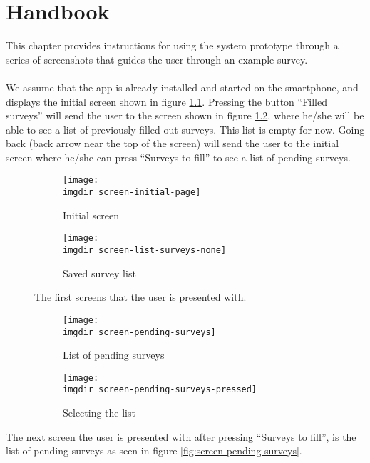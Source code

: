 \chapter{Handbook}
\label{chap:handbook}
This chapter provides instructions for using the system prototype through a series of screenshots that guides the user through an example survey.\\\\
We assume that the app is already installed and started on the smartphone, and displays the initial screen shown in figure \ref{fig:screen-initial-page}. Pressing the button ``Filled surveys'' will send the user to the screen shown in figure \ref{fig:screen-list-surveys-none}, where he/she will be able to see a list of previously filled out surveys. This list is empty for now. Going back (back arrow near the top of the screen) will send the user to the initial screen where he/she can press ``Surveys to fill'' to see a list of pending surveys.
\begin{figure}[!htbp]
 \centering

 \begin{subfigure}{.3\textwidth}
    \centering
    \texttt{[image: \\imgdir screen-initial-page]}
    \caption{Initial screen}
    \label{fig:screen-initial-page}
  \end{subfigure}
  \begin{subfigure}{.3\textwidth}
    \centering
    \texttt{[image: \\imgdir screen-list-surveys-none]}
    \caption{Saved survey list}
    \label{fig:screen-list-surveys-none}
  \end{subfigure}

  \caption{The first screens that the user is presented with.}
  \label{fig:screen-initial-pages}
\end{figure}

\begin{figure}[!htbp]
 \centering
 \begin{subfigure}{.3\textwidth}
  \centering
  \texttt{[image: \\imgdir screen-pending-surveys]}
  \caption{List of pending surveys}
  \label{fig:sfig1}
\end{subfigure}
\begin{subfigure}{.3\textwidth}
  \centering
  \texttt{[image: \\imgdir screen-pending-surveys-pressed]}
  \caption{Selecting the list}
  \label{fig:sfig2}
\end{subfigure}
\caption{...}
 \caption{}
\end{figure}
The next screen the user is presented with after pressing ``Surveys to fill'', is the list of pending surveys as seen in figure \ref{fig:screen-pending-surveys}.


